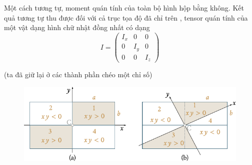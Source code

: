 \noindent
Một cách tương tự, moment quán tính của toàn bộ hình hộp bằng không. Kết quả tương tự thu được đối với cả trục tọa độ đã chỉ trên , tensor quán tính của một vật dạng hình chữ nhật đồng nhất có dạng
\begin{equation}\label{eq:5_43}
	I = \begin{pmatrix}
		I_x&0&0\\
		0&I_y&0\\
		0&0&I_z
	\end{pmatrix}
\end{equation}

\noindent
(ta đã giữ lại ở các thành phần chéo một chỉ số)

\begin{figure}[!htb]
	\begin{center}
		\includegraphics[scale=0.9]{figures/ch_05/fig_5_18.pdf}
		\caption[]{}
		\label{fig:5_18}
	\end{center}
\end{figure}

